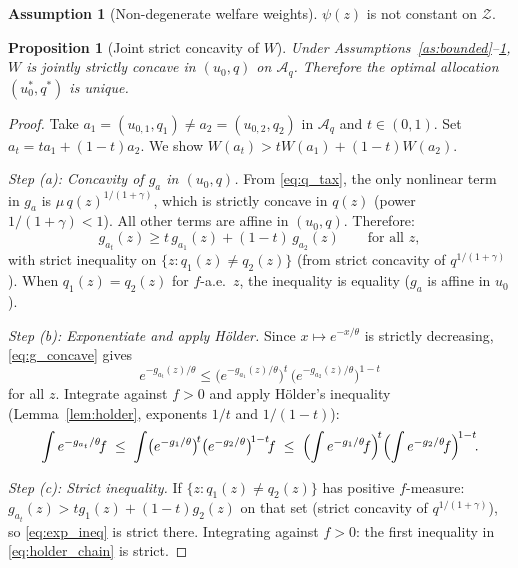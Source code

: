 \documentclass[12pt,a4paper]{article}
\theoremstyle{definition}
\newtheorem{assumption}{Assumption}[section]
\theoremstyle{plain}
\newtheorem{proposition}{Proposition}[section]
\theoremstyle{remark}
\newcommand{\calZ}{\mathcal{Z}}
\newcommand{\calA}{\mathcal{A}}
\begin{document}
\begin{assumption}[Non-degenerate welfare weights]
\label{as:psi}
$\psi(z)$ is not constant on $\calZ$.
\end{assumption}

\begin{proposition}[Joint strict concavity of $W$]
\label{prop:unique_QL}
Under Assumptions~\ref{as:bounded}--\ref{as:psi},
$W$ is jointly strictly concave in $(u_0, q)$ on
$\calA_q$.  Therefore the optimal allocation
$(u_0^*, q^*)$ is unique.
\end{proposition}

\begin{proof}
Take $a_1 = (u_{0,1}, q_1) \neq a_2 = (u_{0,2}, q_2)$
in $\calA_q$ and $t \in (0,1)$.  Set $a_t = ta_1 +
(1-t)a_2$.  We show $W(a_t) > tW(a_1) + (1-t)W(a_2)$.

\emph{Step (a): Concavity of $g_a$ in $(u_0, q)$.}
From \eqref{eq:q_tax}, the only nonlinear term in $g_a$
is $\mu\,q(z)^{1/(1+\gamma)}$, which is strictly concave
in $q(z)$ (power $1/(1+\gamma) < 1$).  All other terms
are affine in $(u_0, q)$.  Therefore:
\begin{equation}
\label{eq:g_concave}
  g_{a_t}(z) \geq t\,g_{a_1}(z) + (1-t)\,g_{a_2}(z)
  \qquad \text{for all } z,
\end{equation}
with strict inequality on
$\{z : q_1(z) \neq q_2(z)\}$ (from strict concavity of
$q^{1/(1+\gamma)}$).  When $q_1(z) = q_2(z)$ for
$f$-a.e.\ $z$, the inequality is equality
($g_a$ is affine in $u_0$).

\emph{Step (b): Exponentiate and apply H\"{o}lder.}
Since $x \mapsto e^{-x/\theta}$ is strictly decreasing,
\eqref{eq:g_concave} gives
\begin{equation}
\label{eq:exp_ineq}
  e^{-g_{a_t}(z)/\theta}
  \leq
  \bigl(e^{-g_{a_1}(z)/\theta}\bigr)^{\!t}\,
  \bigl(e^{-g_{a_2}(z)/\theta}\bigr)^{\!1-t}
\end{equation}
for all $z$.  Integrate against $f > 0$ and apply
H\"{o}lder's inequality
(Lemma~\ref{lem:holder}, exponents $1/t$ and $1/(1-t)$):
\begin{equation}
\label{eq:holder_chain}
  \int e^{-g_{a_t}/\theta}\!f
  \;\leq\;
  \int \bigl(e^{-g_1/\theta}\bigr)^{\!t}
  \bigl(e^{-g_2/\theta}\bigr)^{\!1-t}\!f
  \;\leq\;
  \Bigl(\int e^{-g_1/\theta}\!f\Bigr)^{\!t}
  \Bigl(\int e^{-g_2/\theta}\!f\Bigr)^{\!1-t}\!.
\end{equation}

\emph{Step (c): Strict inequality.}
If $\{z : q_1(z) \neq q_2(z)\}$ has positive $f$-measure:
$g_{a_t}(z) > tg_1(z) + (1-t)g_2(z)$ on that set
(strict concavity of $q^{1/(1+\gamma)}$), so
\eqref{eq:exp_ineq} is strict there.  Integrating
against $f > 0$: the first inequality in
\eqref{eq:holder_chain} is strict.


\end{proof}
\end{document}
